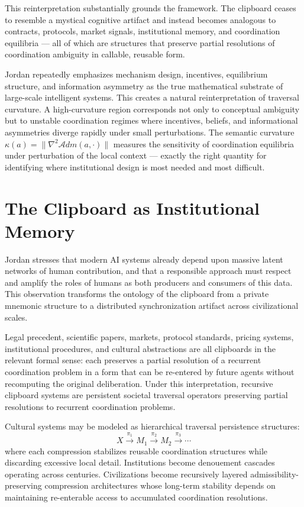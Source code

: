\documentclass[12pt,oneside]{book}
\theoremstyle{plain}
\theoremstyle{definition}
\theoremstyle{plain}
\begin{document}
This reinterpretation substantially grounds the framework. The clipboard ceases to resemble a mystical cognitive artifact and instead becomes analogous to contracts, protocols, market signals, institutional memory, and coordination equilibria --- all of which are structures that preserve partial resolutions of coordination ambiguity in callable, reusable form.

Jordan repeatedly emphasizes mechanism design, incentives, equilibrium structure, and information asymmetry as the true mathematical substrate of large-scale intelligent systems. This creates a natural reinterpretation of traversal curvature. A high-curvature region corresponds not only to conceptual ambiguity but to unstable coordination regimes where incentives, beliefs, and informational asymmetries diverge rapidly under small perturbations. The semantic curvature $\kappa(a) = \|\nabla^2 \mathcal{A}dm(a, \cdot)\|$ measures the sensitivity of coordination equilibria under perturbation of the local context --- exactly the right quantity for identifying where institutional design is most needed and most difficult.

\section{The Clipboard as Institutional Memory}

Jordan stresses that modern AI systems already depend upon massive latent networks of human contribution, and that a responsible approach must respect and amplify the roles of humans as both producers and consumers of this data. This observation transforms the ontology of the clipboard from a private mnemonic structure to a distributed synchronization artifact across civilizational scales.

Legal precedent, scientific papers, markets, protocol standards, pricing systems, institutional procedures, and cultural abstractions are all clipboards in the relevant formal sense: each preserves a partial resolution of a recurrent coordination problem in a form that can be re-entered by future agents without recomputing the original deliberation. Under this interpretation, recursive clipboard systems are persistent societal traversal operators preserving partial resolutions to recurrent coordination problems.

Cultural systems may be modeled as hierarchical traversal persistence structures:
\[
X \xrightarrow{\pi_1} M_1 \xrightarrow{\pi_2} M_2 \xrightarrow{\pi_3} \cdots
\]
where each compression stabilizes reusable coordination structures while discarding excessive local detail. Institutions become denouement cascades operating across centuries. Civilizations become recursively layered admissibility-preserving compression architectures whose long-term stability depends on maintaining re-enterable access to accumulated coordination resolutions.
\end{document}
